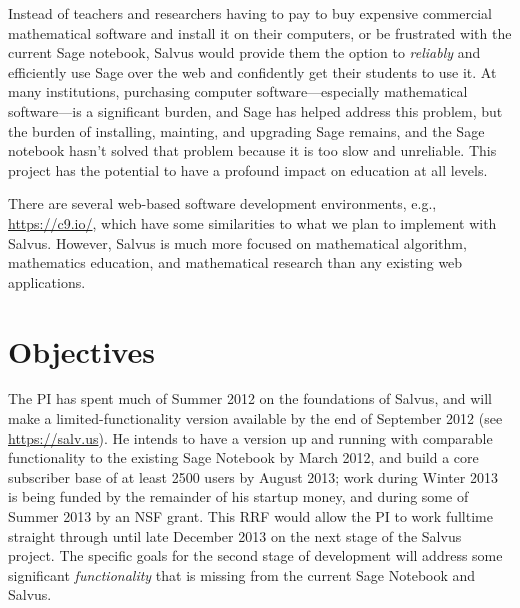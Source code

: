 \documentclass[11pt]{article}
\begin{document}
Instead of teachers and researchers having to pay to buy expensive
commercial mathematical software and install it on their computers, or
be frustrated with the current Sage notebook, Salvus would provide
them the option to {\em reliably} and efficiently use Sage over the
web and confidently get their students to use it.  At many
institutions, purchasing computer software---especially mathematical
software---is a significant burden, and Sage has helped address this
problem, but the burden of installing, mainting, and upgrading Sage
remains, and the Sage notebook hasn't solved that problem because it
is too slow and unreliable.  This project has the potential to have a
profound impact on education at all levels.

There are several web-based software development environments, e.g.,
\url{https://c9.io/}, which have some similarities to what we plan to
implement with Salvus.  However, Salvus is much more focused on
mathematical algorithm, mathematics education, and
mathematical research than any existing web applications.

\section{Objectives}

The PI has spent much of Summer 2012 on the foundations of Salvus, and
will make a limited-functionality version available by the end of
September 2012 (see \url{https://salv.us}).  He intends to have a version up and running with
comparable functionality to the existing Sage Notebook by March 2012,
and build a core subscriber base of at least 2500 users by August
2013; work during Winter 2013 is being funded by the remainder of his
startup money, and during some of Summer 2013 by an NSF grant.  This
RRF would allow the PI to work fulltime straight through until late
December 2013 on the next stage of the Salvus project. The specific
goals for the second stage of development will address some
significant {\em functionality} that is  missing from the
current Sage Notebook and Salvus.
\end{document}
